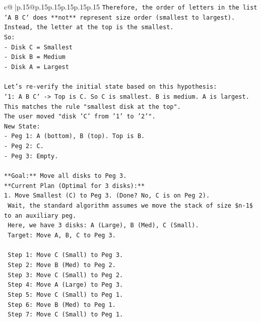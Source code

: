 \documentclass{article}
\begin{document}
{\begin{supertabular}{c@{$\;$}|p{.15\linewidth}@{}p{.15\linewidth}p{.15\linewidth}p{.15\linewidth}p{.15\linewidth}p{.15\linewidth}}
{{{\texttt{Therefore, the order of letters in the list `A B C` does **not** represent size order (smallest to largest). Instead, the letter at the top is the smallest.} \\
\texttt{So:} \\
\texttt{{-} Disk C = Smallest} \\
\texttt{{-} Disk B = Medium} \\
\texttt{{-} Disk A = Largest} \\
\\ 
\texttt{Let's re{-}verify the initial state based on this hypothesis:} \\
\texttt{`1: A B C` {-}> Top is C. So C is smallest. B is medium. A is largest.} \\
\texttt{This matches the rule "smallest disk at the top".} \\
\texttt{The user moved "disk 'C' from '1' to '2'".} \\
\texttt{New State:} \\
\texttt{{-} Peg 1: A (bottom), B (top). Top is B.} \\
\texttt{{-} Peg 2: C.} \\
\texttt{{-} Peg 3: Empty.} \\
\\ 
\texttt{**Goal:** Move all disks to Peg 3.} \\
\texttt{**Current Plan (Optimal for 3 disks):**} \\
\texttt{1. Move Smallest (C) to Peg 3. (Done? No, C is on Peg 2).} \\
\texttt{   Wait, the standard algorithm assumes we move the stack of size \$n{-}1\$ to an auxiliary peg.} \\
\texttt{   Here, we have 3 disks: A (Large), B (Med), C (Small).} \\
\texttt{   Target: Move A, B, C to Peg 3.} \\
\\ 
\texttt{   Step 1: Move C (Small) to Peg 3.} \\
\texttt{   Step 2: Move B (Med) to Peg 2.} \\
\texttt{   Step 3: Move C (Small) to Peg 2.} \\
\texttt{   Step 4: Move A (Large) to Peg 3.} \\
\texttt{   Step 5: Move C (Small) to Peg 1.} \\
\texttt{   Step 6: Move B (Med) to Peg 1.} \\
\texttt{   Step 7: Move C (Small) to Peg 1.} \\
\\ 
}}}
\end{supertabular}}
\end{document}
